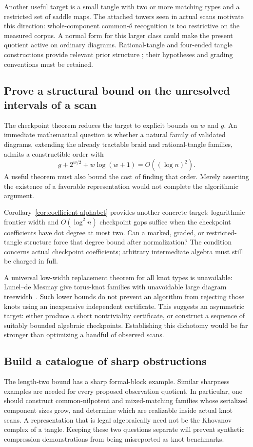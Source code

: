 Another useful target is a small tangle with two or more matching types and a
restricted set of saddle maps. The attached towers seen in actual scans
motivate this direction: whole-component common-$\theta$ recognition is too
restrictive on the measured corpus. A normal form for this larger class could
make the present quotient active on ordinary diagrams. Rational-tangle and
four-ended tangle constructions provide relevant prior structure
\cite{thompson,immersed}; their
hypotheses and grading conventions must be retained.

\subsection{Prove a structural bound on the unresolved intervals of a scan}
The checkpoint theorem reduces the target to explicit bounds on $w$ and $g$.
An immediate mathematical question is whether a natural family of validated
diagrams, extending the already tractable braid and rational-tangle families,
admits a constructible order with
\[
 g+2^{w/2}+w\log(w+1)=O((\log n)^2).
\]
A useful theorem must also bound the cost of finding that order. Merely
asserting the existence of a favorable representation would not complete the
algorithmic argument.

Corollary~\ref{cor:coefficient-alphabet} provides another concrete target:
logarithmic frontier width and $O(\log^2 n)$ checkpoint gaps suffice when
the checkpoint coefficients have dot degree at most two. Can a marked,
graded, or restricted-tangle structure force that degree bound after
normalization? The condition concerns actual checkpoint coefficients;
arbitrary intermediate algebra must still be charged in full.

A universal low-width replacement theorem for all knot types is unavailable:
Lunel--de Mesmay give torus-knot families with unavoidable large diagram
treewidth~\cite{widthobstruction}. Such lower bounds do not prevent an
algorithm from rejecting those knots using an inexpensive independent
certificate. This suggests an asymmetric target: either produce a short
nontriviality certificate, or construct a sequence of suitably bounded
algebraic checkpoints. Establishing this dichotomy would be far stronger
than optimizing a handful of observed scans.

\subsection{Build a catalogue of sharp obstructions}
The length-two bound has a sharp formal-block example. Similar sharpness
examples are needed for every proposed observation quotient. In particular,
one should construct common-nilpotent and mixed-matching families whose
serialized component sizes grow, and determine which are realizable inside
actual knot scans. A representation that is legal algebraically need not be
the Khovanov complex of a tangle. Keeping these two questions separate will
prevent synthetic compression demonstrations from being misreported as knot
benchmarks.

